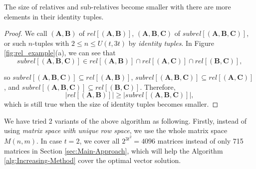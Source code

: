 \begin{thm}
The size of relatives and sub-relatives become smaller with there
are more elements in their identity tuples. \label{theo:size_rel}
\end{thm}
\begin{proof}
We call $\left(\boldsymbol{A},\boldsymbol{B}\right)$ of $rel\left[\left(\boldsymbol{A},\boldsymbol{B}\right)\right]$,
$\left(\boldsymbol{A},\boldsymbol{B},\boldsymbol{C}\right)$ of $subrel\left[\left(\boldsymbol{A},\boldsymbol{B},\boldsymbol{C}\right)\right]$,
or such $n$-tuples with $2\leq n\leq U\left(t,3t\right)$ by \textit{identity
tuples}. In Figure \ref{fig:rel_example}(a), we can see that 
\[
subrel\left[\left(\boldsymbol{A},\boldsymbol{B},\boldsymbol{C}\right)\right]\in rel\left[\left(\boldsymbol{A},\boldsymbol{B}\right)\right]\cap rel\left[\left(\boldsymbol{A},\boldsymbol{C}\right)\right]\cap rel\left[\left(\boldsymbol{B},\boldsymbol{C}\right)\right],
\]

so $subrel\left[\left(\boldsymbol{A},\boldsymbol{B},\boldsymbol{C}\right)\right]\subseteq rel\left[\left(\boldsymbol{A},\boldsymbol{B}\right)\right]$,
$subrel\left[\left(\boldsymbol{A},\boldsymbol{B},\boldsymbol{C}\right)\right]\subseteq rel\left[\left(\boldsymbol{A},\boldsymbol{C}\right)\right]$,
and $subrel\left[\left(\boldsymbol{A},\boldsymbol{B},\boldsymbol{C}\right)\right]\subseteq rel\left[\left(\boldsymbol{B},\boldsymbol{C}\right)\right]$.
Therefore,
\[
\left|rel\left[\left(\boldsymbol{A},\boldsymbol{B}\right)\right]\right|\geq\left|subrel\left[\left(\boldsymbol{A},\boldsymbol{B},\boldsymbol{C}\right)\right]\right|,
\]
which is still true when the size of identity tuples becomes smaller.
\end{proof}
We have tried 2 variants of the above algorithm as following. Firstly,
instead of using \textit{matrix space with unique row space}, we use
the whole matrix space $M\left(n,m\right)$. In case $t=2$, we cover
all $2^{3t^{2}}=4096$ matrices instead of only 715 matrices in Section
\ref{sec:Main-Approach}, which will help the Algorithm \ref{alg:Increasing-Method}
cover the optimal vector solution.
